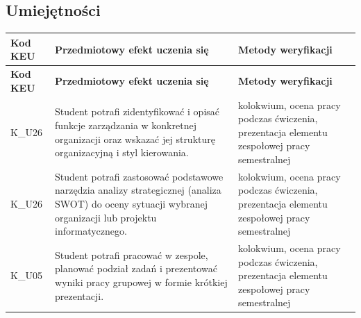 \documentclass[12pt, a4paper]{article}
\newcommand{\thdrule}{\noalign{\global\setlength{\extrarowheight}{0pt}}}
\newcommand{\thdend}{\noalign{\global\setlength{\extrarowheight}{3pt}}}
\begin{document}
\subsection*{Umiejętności}
{\scriptsize
\begin{longtable}{m{1.6cm}m{9.0cm}m{4.2cm}}
\thdrule\toprule
\rowcolor{pjatkRed} {\color{white}\footnotesize\textbf{\vphantom{Ag}Kod KEU}} & {\color{white}\footnotesize\textbf{\vphantom{Ag}Przedmiotowy efekt uczenia się}} & {\color{white}\footnotesize\textbf{\vphantom{Ag}Metody weryfikacji}} \\
\midrule\thdend
\endfirsthead
\thdrule\toprule
\rowcolor{pjatkRed} {\color{white}\footnotesize\textbf{\vphantom{Ag}Kod KEU}} & {\color{white}\footnotesize\textbf{\vphantom{Ag}Przedmiotowy efekt uczenia się}} & {\color{white}\footnotesize\textbf{\vphantom{Ag}Metody weryfikacji}} \\
\midrule\thdend
\endhead
  \rowcolor{tableRowLight} K\_U26 & Student potrafi zidentyfikować i opisać funkcje zarządzania w konkretnej organizacji oraz wskazać jej strukturę organizacyjną i styl kierowania. & kolokwium, ocena pracy podczas ćwiczenia, prezentacja elementu zespołowej pracy semestralnej \\
  \rowcolor{tableRowAlt} K\_U26 & Student potrafi zastosować podstawowe narzędzia analizy strategicznej (analiza SWOT) do oceny sytuacji wybranej organizacji lub projektu informatycznego. & kolokwium, ocena pracy podczas ćwiczenia, prezentacja elementu zespołowej pracy semestralnej \\
  \rowcolor{tableRowLight} K\_U05 & Student potrafi pracować w zespole, planować podział zadań i prezentować wyniki pracy grupowej w formie krótkiej prezentacji. & kolokwium, ocena pracy podczas ćwiczenia, prezentacja elementu zespołowej pracy semestralnej \\
\bottomrule
\end{longtable}}
\end{document}
